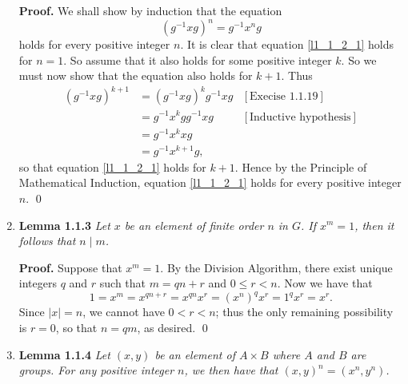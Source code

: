 \begin{enumerate}
      \textbf{Proof.} We shall show by induction that the equation
      \begin{equation}
         (g^{-1}xg)^n = g^{-1}x^ng \label{l1_1_2_1}
      \end{equation}
      holds for every positive integer $n$. It is clear that equation
      \ref{l1_1_2_1} holds for $n = 1$. So assume that it also holds for some
      positive integer $k$. So we must now show that the equation also holds for 
      $k + 1$. Thus
      \begin{align*}
         (g^{-1}xg)^{k+1} &= (g^{-1}xg)^kg^{-1}xg &[\text{Execise 1.1.19}] \\
                     &= g^{-1}x^kgg^{-1}xg &[\text{Inductive hypothesis}] \\
                     &= g^{-1}x^kxg \\
                     &= g^{-1}x^{k+1}g,
      \end{align*}
      so that equation \eqref{l1_1_2_1} holds for $k+1$. Hence by the Principle 
      of Mathematical Induction, equation \eqref{l1_1_2_1} holds for every 
      positive integer $n$. \qed
   \item[]        \textbf{Lemma 1.1.3} \textit{Let $x$ be an element of finite
                  order $n$ in $G$. If $x^m = 1$, then it follows that
                  $n \mid m$.}

      \textbf{Proof.} Suppose that $x^m = 1$. By the Division Algorithm, there
      exist unique integers $q$ and $r$ such that $m = qn + r$ and
      $0 \le r < n$. Now we have that
      $$1 = x^m = x^{qn+r} = x^{qn}x^r = (x^n)^qx^r = 1^qx^r = x^r.$$
      Since $|x| = n$, we cannot have $0 < r < n$; thus the only remaining
      possibility is $r = 0$, so that $n = qm$, as desired. \qed
   \item[]        \textbf{Lemma 1.1.4} \textit{Let $(x, y)$ be an element of
                  $A \times B$ where $A$ and $B$ are groups. For any positive
                  integer $n$, we then have that $(x, y)^n = (x^n, y^n)$.}


\end{enumerate}
